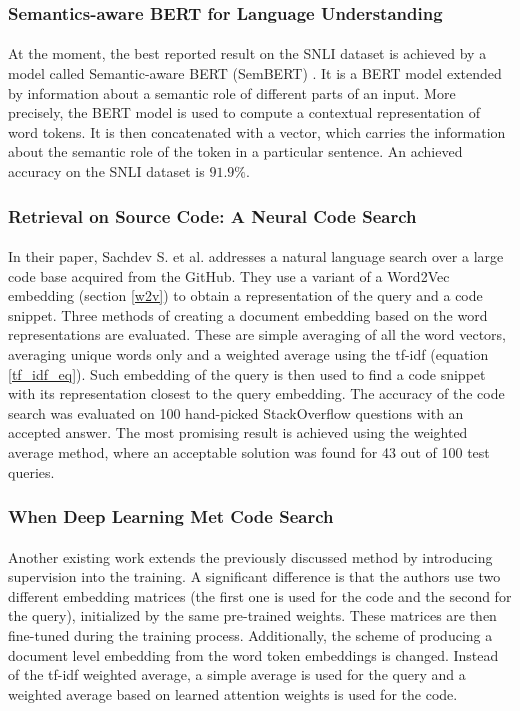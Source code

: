 \subsubsection{Semantics-aware BERT for Language Understanding}
\paragraph{}
At the moment, the best reported result on the SNLI dataset is achieved by a model called Semantic-aware BERT (SemBERT) \cite{semBERT}. It is a BERT \cite{bert} model extended by information about a semantic role of different parts of an input. More precisely, the BERT model is used to compute a contextual representation of word tokens. It is then concatenated with a vector, which carries the information about the semantic role of the token in a particular sentence. An achieved accuracy on the SNLI dataset is $91.9\%$.
 
\subsubsection{Retrieval on Source Code: A Neural Code Search}
\paragraph{}
In their paper, Sachdev S. et al. \cite{facebook0_unsupervised} addresses a natural language search over a large code base acquired from the GitHub. They use a variant of a Word2Vec embedding (section \ref{w2v}) to obtain a representation of the query and a code snippet. Three methods of creating a document embedding based on the word representations are evaluated. These are simple averaging of all the word vectors, averaging unique words only and a weighted average using the tf-idf (equation \ref{tf_idf_eq}). Such embedding of the query is then used to find a code snippet with its representation closest to the query embedding. The accuracy of the code search was evaluated on 100 hand-picked StackOverflow questions with an accepted answer. The most promising result is achieved using the weighted average method, where an acceptable solution was found for 43 out of 100 test queries.

\subsubsection{When Deep Learning Met Code Search}
\paragraph{}
Another existing work \cite{facebook1_supervised} extends the previously discussed method by introducing supervision into the training. A significant difference is that the authors use two different embedding matrices (the first one is used for the code and the second for the query), initialized by the same pre-trained weights. These matrices are then fine-tuned during the training process. Additionally, the scheme of producing a document level embedding from the word token embeddings is changed. Instead of the tf-idf weighted average, a simple average is used for the query and a weighted average based on learned attention weights is used for the code. 
